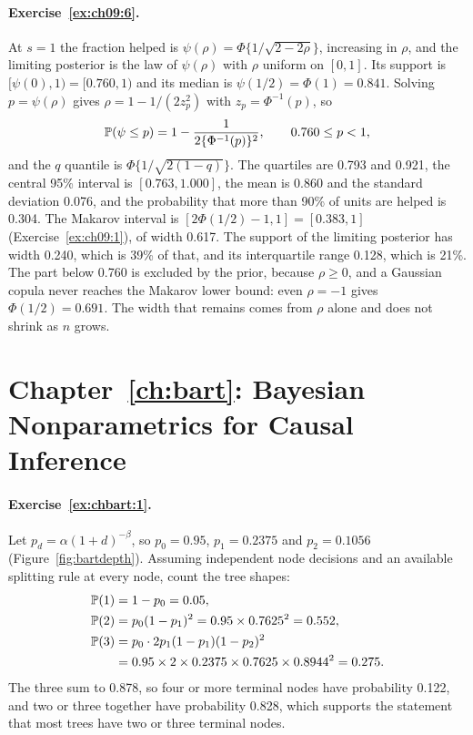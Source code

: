 \paragraph{Exercise~\ref{ex:ch09:6}.} At $s = 1$ the fraction helped is $\psi(\rho) = \Phi\{1/\sqrt{2 - 2\rho}\}$, increasing in $\rho$, and the limiting posterior is the law of $\psi(\rho)$ with $\rho$ uniform on $[0, 1]$. Its support is $[\psi(0), 1) = [0.760, 1)$ and its median is $\psi(1/2) = \Phi(1) = 0.841$. Solving $p = \psi(\rho)$ gives $\rho = 1 - 1/(2z_p^2)$ with $z_p = \Phi^{-1}(p)$, so
\[
\mathbb{P}(\psi \le p) = 1 - \frac{1}{2\{\Phi^{-1}(p)\}^2}, \qquad 0.760 \le p < 1,
\]
and the $q$ quantile is $\Phi\{1/\sqrt{2(1 - q)}\}$. The quartiles are 0.793 and 0.921, the central 95\% interval is $[0.763, 1.000]$, the mean is 0.860 and the standard deviation 0.076, and the probability that more than 90\% of units are helped is 0.304. The Makarov interval is $[2\Phi(1/2) - 1, 1] = [0.383, 1]$ (Exercise~\ref{ex:ch09:1}), of width 0.617. The support of the limiting posterior has width 0.240, which is 39\% of that, and its interquartile range 0.128, which is 21\%. The part below 0.760 is excluded by the prior, because $\rho \ge 0$, and a Gaussian copula never reaches the Makarov lower bound: even $\rho = -1$ gives $\Phi(1/2) = 0.691$. The width that remains comes from $\rho$ alone and does not shrink as $n$ grows.

\section*{Chapter~\ref{ch:bart}: Bayesian Nonparametrics for Causal Inference}

\paragraph{Exercise~\ref{ex:chbart:1}.} Let $p_d = \alpha(1+d)^{-\beta}$, so $p_0 = 0.95$, $p_1 = 0.2375$ and $p_2 = 0.1056$ (Figure~\ref{fig:bartdepth}). Assuming independent node decisions and an available splitting rule at every node, count the tree shapes:
\begin{align*}
\mathbb{P}(1) &= 1 - p_0 = 0.05, \\
\mathbb{P}(2) &= p_0(1 - p_1)^2 = 0.95 \times 0.7625^2 = 0.552, \\
\mathbb{P}(3) &= p_0\cdot 2p_1(1 - p_1)(1 - p_2)^2 \\
&= 0.95 \times 2 \times 0.2375 \times 0.7625 \times 0.8944^2 = 0.275.
\end{align*}
The three sum to 0.878, so four or more terminal nodes have probability 0.122, and two or three together have probability 0.828, which supports the statement that most trees have two or three terminal nodes.

